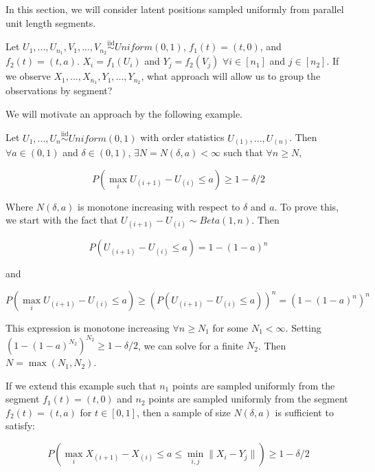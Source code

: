 \documentclass[
  11pt,
]{article}
\begin{document}
In this section, we will consider latent positions sampled uniformly
from parallel unit length segments.

\begin{example}
Let $U_1, ..., U_{n_1}, V_1, ..., V_{n_2} \stackrel{\text{iid}}{\sim}Uniform(0, 1)$, $f_1(t) = (t, 0)$, and $f_2(t) = (t, a)$. $X_i = f_1(U_i)$ and $Y_j = f_2(V_j)$ $\forall i \in [n_1]$ and $j \in [n_2]$. If we observe $X_1, ..., X_{n_1}, Y_1, ..., Y_{n_2}$, what approach will allow us to group the observations by segment?
\end{example}

We will motivate an approach by the following example.

\begin{example}
Let $U_1, ..., U_n \stackrel{\text{iid}}{\sim}Uniform(0, 1)$ with order statistics 
$U_{(1)}, ..., U_{(n)}$. Then $\forall a \in (0, 1)$ and $\delta \in (0, 1)$, $\exists N = N(\delta, a) < \infty$ such that $\forall n \geq N$, 

\begin{equation}
P(\max_i U_{(i+1)} - U_{(i)} \leq a) \geq 1 - \delta / 2
\end{equation}

Where $N(\delta, a)$ is monotone increasing with respect to $\delta$ and $a$. To prove this, we start with the fact that $U_{(i+1)} - U_{(i)} \sim Beta(1, n)$. Then 

\begin{equation}
P(U_{(i+1)} - U_{(i)} \leq a) = 1 - (1 - a)^n
\end{equation}

and 

\begin{equation}
\label{eq:unsolvable}
P(\max_i U_{(i+1)} - U_{(i)} \leq a) \geq (P(U_{(i+1)} - U_{(i)} \leq a))^n = (1 - (1 - a)^n)^n
\end{equation}

This expression is monotone increasing $\forall n \geq N_1$ for some $N_1 < \infty$. 
Setting $(1 - (1 - a)^{N_2})^{N_2} \geq 1 - \delta / 2$, we can solve for a finite ${N_2}$. Then $N = \max(N_1, N_2)$.
\end{example}

If we extend this example such that \(n_1\) points are sampled uniformly
from the segment \(f_1(t) = (t, 0)\) and \(n_2\) points are sampled
uniformly from the segment \(f_2(t) = (t, a)\) for \(t \in [0, 1]\),
then a sample of size \(N(\delta, a)\) is sufficient to satisfy:

\begin{equation}
P(\max_i X_{(i+1)} - X_{(i)} \leq a \leq \min_{i, j} \|X_i - Y_j\|) 
\geq 1 - \delta / 2
\end{equation}
\end{document}
